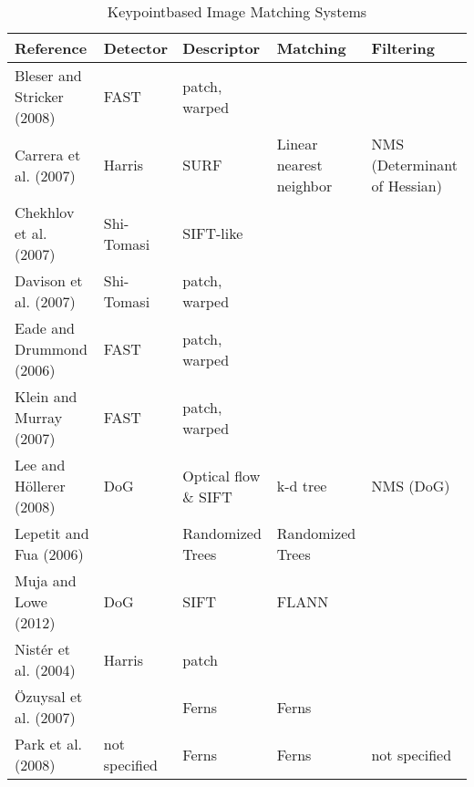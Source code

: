 \begin{table*}[t]
  \caption{Keypointbased Image Matching Systems}
  \label{tab:matching_applications}
  \centering
  \begin{tabularx}{\textwidth}{p{}    %
                               p{}    %
                               p{}     %
                               p{}    %
                               p{}}     %
  	\hline
      Reference & Detector & Descriptor & Matching & Filtering \\
    \hline
    Bleser and Stricker (2008)\cite{bleser_advanced_2008} 	& FAST 			  & patch, warped 	        &  &  \\
    Carrera et al. (2007)\cite{carrera_robust_2007}         & Harris      & SURF                    & Linear nearest neighbor & NMS (Determinant of Hessian) \\
    Chekhlov et al. (2007)\cite{chekhlov_robust_2007}       & Shi-Tomasi  & SIFT-like               &  &  \\
    Davison et al. (2007)\cite{davison_monoslam:_2007}      & Shi-Tomasi  & patch, warped           &  &  \\
    Eade and Drummond (2006)\cite{eade_scalable_2006}       & FAST        & patch, warped           &  &  \\
    Klein and Murray (2007)\cite{klein_parallel_2007}       & FAST        & patch, warped           &  &  \\
    Lee and H\"{o}llerer (2008)\cite{lee_hybrid_2008}       & DoG         & Optical flow \& SIFT    &  k-d tree & NMS (DoG) \\
    Lepetit and Fua (2006)\cite{lepetit_keypoint_2006}      &             & Randomized Trees        & Randomized Trees &   \\
    Muja and Lowe (2012)\cite{muja_fast_2012}               & DoG         & SIFT                    & FLANN   & \\
    Nist\'{e}r et al. (2004)\cite{nister_visual_2004}       & Harris      & patch                   &  &  \\
    \"{O}zuysal et al. (2007)\cite{ozuysal_fast_2007}       &             & Ferns                   & Ferns  & \\
    Park et al. (2008)\cite{park_multiple_2008}             & not specified & Ferns                   & Ferns  & not specified \\

\end{tabularx}
\end{table*}

